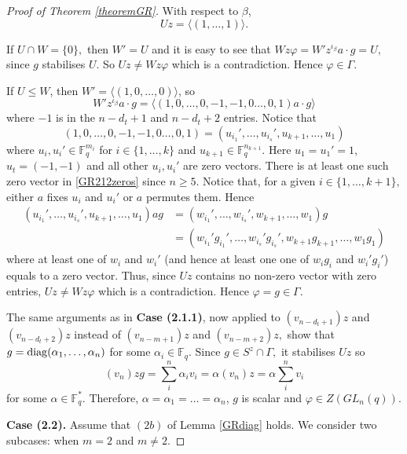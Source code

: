 \begin{proof}[Proof of Theorem {\rm \ref{theoremGR}}]
 With respect to $\beta$,
$$Uz= \langle (1, \ldots, 1) \rangle.$$


 If $U \cap W=\{0\},$ then $W'=U$ and it is easy to see that $Wz \varphi = W'z^{\iota_{\beta}}a\cdot g= U,$ since $g$ stabilises $U$. So $Uz \ne Wz \varphi$ which is a contradiction. Hence $\varphi \in \Gamma.$

If $U \le W$, then $W'= \langle (1 , 0,\ldots, 0) \rangle$, so 
$$W'z^{\iota_{\beta}}a \cdot g= \langle 
(1 , 0, \ldots, 0, -1,-1, 0 \ldots, 0,  1)a \cdot g
 \rangle$$
where $-1$ is in the ${n-d_t+1}$ and ${n-d_t+2}$ entries. Notice that 
\begin{equation}
\label{GR212zeros}
(1 , 0, \ldots, 0, -1,-1, 0 \ldots, 0,  1)=(u_{i_1}', \ldots, u_{i_s}', u_{k+1}, \ldots, u_1)
\end{equation}
where $u_i, u_i' \in \mathbb{F}_q^{m_i}$ for $i \in \{1, \ldots, k\}$ and  $u_{k+1} \in \mathbb{F}_q^{n_{k+1}}.$ Here $u_1=u_1'=1$, $u_t=(-1,-1)$ and all other $u_i, u_i'$ are zero vectors. There is at least one such zero vector in \eqref{GR212zeros} since $n \ge 5.$ Notice that,  for a given $i \in \{1, \ldots, k+1\},$  either $a$ fixes $u_i$ and $u_i'$ or $a$ permutes them. Hence 
\begin{align*}
(u_{i_1}', \ldots, u_{i_s}', u_{k+1}, \ldots, u_1)ag & =(w_{i_1}', \ldots, w_{i_s}', w_{k+1}, \ldots, w_1)g \\
& =(w_{i_1}'g_{i_1}', \ldots, w_{i_s}'g_{i_s}', w_{k+1}g_{k+1}, \ldots, w_1g_1)
\end{align*}
where at least one of $w_i$ and $w_i'$ (and hence at least one one of $w_ig_i$ and $w_i'g_i'$) equals to a zero vector. Thus, since $Uz$ contains no non-zero vector with zero entries, $Uz \ne Wz \varphi$ which is a contradiction. Hence $\varphi =g\in \Gamma.$

The same arguments as  in {\bf Case (2.1.1)}, now applied to $(v_{n-d_t+1})z$ and $(v_{n-d_t+2})z$ instead of $(v_{n-m+1})z$ and $(v_{n-m+2})z,$ show that $g=\mathrm{diag}(\alpha_1, \ldots, \alpha_n)$ for some $\alpha_i \in \mathbb{F}_q.$ Since $g \in S^z \cap \Gamma,$ it stabilises $Uz$ so
$$(v_n)z g = \sum_i^n \alpha_i v_i = \alpha (v_n)z= \alpha \sum_i^n v_i$$
for some $\alpha \in \mathbb{F}_q^*.$ Therefore, $\alpha=\alpha_1 = \ldots = \alpha_n$, $g$ is scalar and $\varphi \in Z(GL_n(q)).$

\bigskip

{\bf Case (2.2).} Assume that $(2b)$ of Lemma \ref{GRdiag} holds. We consider two subcases: when $m=2$ and $m \ne 2$.

\medskip


\end{proof}
